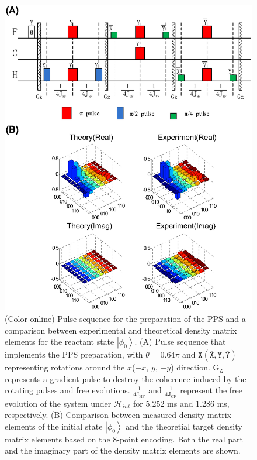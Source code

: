 \documentclass[twocolumn,showpacs,twoside,10pt,prl]{revtex4}
\begin{document}
\begin{figure}[h]
\includegraphics[width= 0.95\columnwidth]{pps.eps}
\caption{\footnotesize{(Color online) Pulse sequence for the preparation of the PPS and a comparison between experimental and theoretical density matrix elements for the reactant state $\left\vert \phi_{0} \right\rangle$.
(A) Pulse sequence that implements the PPS preparation, with $\theta=0.64\pi$ and $\texttt{X}(\overline{\texttt{X}}, \texttt{Y}, \overline{\texttt{Y}})$ representing rotations around the $x$($-x$, $y$, $-y$) direction. G$_\text{Z}$ represents a gradient pulse to destroy the coherence induced by
  the rotating pulses and free evolutions. $\frac{1}{4\text{J}_{\text{HF}}}$ and $\frac{1}{4\text{J}_{\text{CF}}}$ represent the free evolution of the system under $\mathcal{H}_{int}$ for 5.252 ms and 1.286 ms, respectively.
(B) Comparison between measured density matrix elements of the initial state $\left\vert \phi_{0} \right\rangle$ and the theoretial target density matrix elements based on the 8-point encoding. Both the real part and the imaginary part of the density matrix elements are shown.}}
\label{pps}
\end{figure}
\end{document}
